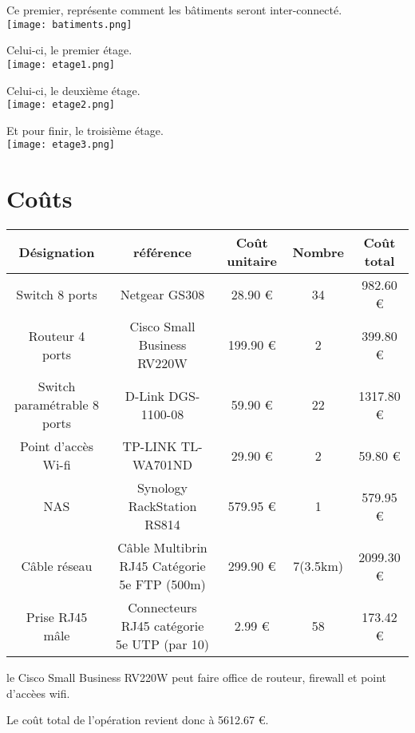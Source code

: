 \documentclass[oneside,10pt]{article}
\begin{document}
Ce premier, repr\'esente comment les b\^atiments seront inter-connect\'e.\\
\texttt{[image: batiments.png]} 

Celui-ci, le premier \'etage.\\
\texttt{[image: etage1.png]}

Celui-ci, le deuxi\`eme \'etage.\\
\texttt{[image: etage2.png]} 

Et pour finir, le troisi\`eme \'etage.\\
\texttt{[image: etage3.png]} 

\section{Co\^uts}
\begin{tabular}{|c|c|c|c|c|}
  \hline
  D\'esignation & r\'ef\'erence & Co\^ut unitaire & Nombre & Co\^ut total \\
  \hline \hline
  Switch 8 ports & Netgear GS308 & 28.90 \euro & 34 & 982.60 \euro \\
  \hline
  Routeur 4 ports & Cisco Small Business RV220W & 199.90 \euro & 2 & 399.80 \euro \\
  \hline
  Switch param\'etrable 8 ports & D-Link DGS-1100-08 & 59.90 \euro & 22 & 1317.80 \euro \\
  \hline
  Point d'acc\`es Wi-fi & TP-LINK TL-WA701ND & 29.90 \euro & 2 & 59.80 \euro \\
  \hline
  NAS & Synology RackStation RS814 & 579.95 \euro & 1 & 579.95 \euro \\
  \hline
  C\^able r\'eseau & C\^able Multibrin RJ45 Cat\'egorie 5e FTP (500m) & 299.90 \euro & 7(3.5km) & 2099.30 \euro \\
  \hline
  Prise RJ45 m\^ale & Connecteurs RJ45 cat\'egorie 5e UTP (par 10) & 2.99 \euro & 58 & 173.42 \euro \\
  \hline

\end{tabular}

le Cisco Small Business RV220W  peut faire office de routeur, firewall et point d'acc\`ees wifi.

Le co\^ut total de l'op\'eration revient donc \`a 5612.67 \euro.
\end{document}
